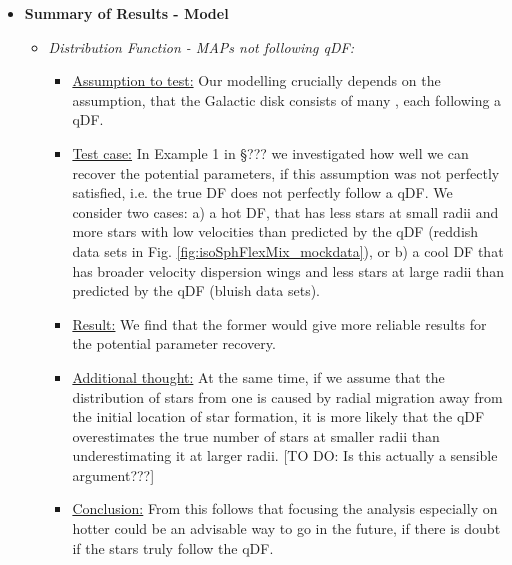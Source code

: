 \begin{itemize}

\item \textbf{Summary of Results - Model}

\begin{itemize}
\item \emph{Distribution Function - MAPs not following qDF:} 
\begin{itemize}
\item \underline{Assumption to test:} Our modelling crucially depends on the assumption, that the Galactic disk consists of many \MAPs, each following a qDF. 
\item \underline{Test case:} In Example 1 in \S ??? we investigated how well we can recover the potential parameters, if this assumption was not perfectly satisfied, i.e. the \MAPs true DF does not perfectly follow a qDF. We consider two cases: a) a hot DF, that has less stars at small radii and more stars with low velocities than predicted by the qDF (reddish data sets in Fig. \ref{fig:isoSphFlexMix_mockdata}), or b) a cool DF that has broader velocity dispersion wings and less stars at large radii than predicted by the qDF (bluish data sets). 
\item \underline{Result:} We find that the former would give more reliable results for the potential parameter recovery.
\item \underline{Additional thought:} At the same time, if we assume that the distribution of stars from one \MAP is caused by radial migration away from the initial location of star formation, it is more likely that the qDF overestimates the true number of stars at smaller radii than underestimating it at larger radii. [TO DO: Is this actually a sensible argument???] 
\item \underline{Conclusion:} From this follows that focusing the analysis especially on hotter \MAPs could be an advisable way to go in the future, if there is doubt if the stars truly follow the qDF.
\end{itemize}


\end{itemize}
\end{itemize}
